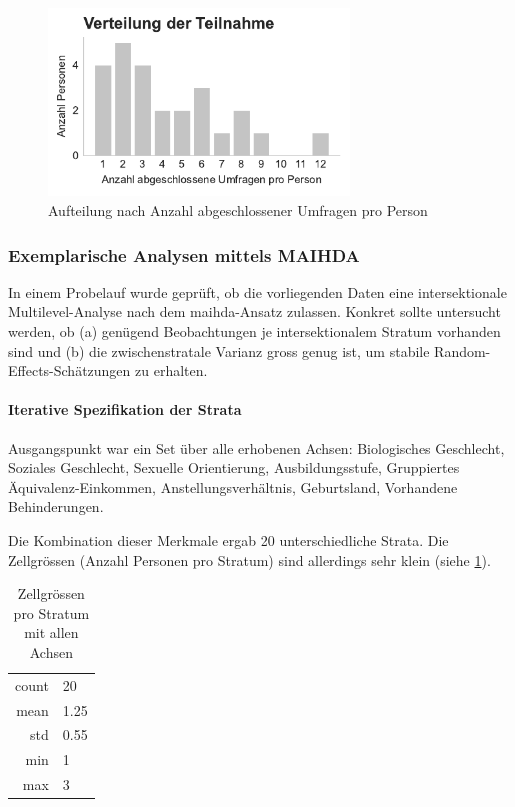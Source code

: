 \begin{figure}[htbp]
    \centering
    \includegraphics[width=8cm]{analysis/plots/survey_counts.pdf}
    \caption{Aufteilung nach Anzahl abgeschlossener Umfragen pro Person}
    \label{fig:survey_counts}
\end{figure}


\subsubsection*{Exemplarische Analysen mittels MAIHDA}
\label{sec:pilot_maihda}

In einem Probelauf wurde geprüft, ob die vorliegenden Daten eine intersektionale Multilevel-Analyse nach dem \gls{maihda}-Ansatz zulassen. Konkret sollte untersucht werden, ob (a) genügend Beobachtungen je intersektionalem Stratum vorhanden sind und (b) die zwischenstratale Varianz gross genug ist, um stabile Random-Effects-Schätzungen zu erhalten.

\paragraph{Iterative Spezifikation der Strata}
Ausgangspunkt war ein Set über alle erhobenen Achsen: Biologisches Geschlecht, Soziales Geschlecht, Sexuelle Orientierung, Ausbildungsstufe, Gruppiertes Äquivalenz-Einkommen, Anstellungsverhältnis, Geburtsland, Vorhandene Behinderungen.

Die Kombination dieser Merkmale ergab 20 unterschiedliche Strata. Die Zellgrössen (Anzahl Personen pro Stratum) sind allerdings sehr klein (siehe \cref{tab:zellgroessen_alle_achsen}).

\begin{table}[h]
    \centering
    \begin{tabular}{rl}
        count & 20 \\
        mean & 1.25 \\
        std & 0.55 \\
        min & 1 \\
        max & 3 \\
    \end{tabular}
    \caption{Zellgrössen pro Stratum mit allen Achsen}
    \label{tab:zellgroessen_alle_achsen}
\end{table}

